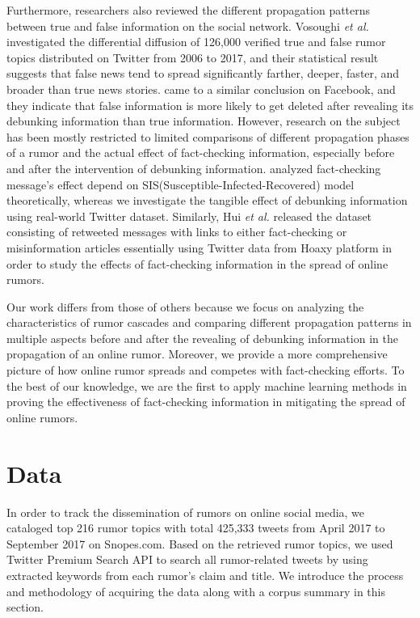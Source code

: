 \documentclass[conference]{IEEEtran}
\begin{document}
	Furthermore, researchers also reviewed the different propagation patterns between true and false information on the social network. Vosoughi \textit{et al.} \cite{vosoughi2018spread} investigated the differential diffusion of 126,000 verified true and false rumor topics distributed on Twitter from 2006 to 2017, and their statistical result suggests that false news tend to spread significantly farther, deeper, faster, and broader than true news stories. \cite{friggeri2014rumor} came to a similar conclusion on Facebook, and they indicate that false information is more likely to get deleted after revealing its debunking information than true information. However, research on the subject has been mostly restricted to limited comparisons of different propagation phases of a rumor and the actual effect of fact-checking information, especially before and after the intervention of debunking information. \cite{tambuscio2015fact} analyzed fact-checking message's effect depend on SIS(Susceptible-Infected-Recovered) model theoretically, whereas we investigate the tangible effect of debunking information using real-world Twitter dataset. Similarly, Hui \textit{et al.} \cite{hui2018hoaxy} released the dataset consisting of retweeted messages with links to either fact-checking or misinformation articles essentially using Twitter data from Hoaxy platform \cite{shao2016hoaxy} in order to study the effects of fact-checking information in the spread of online rumors.  
	
	Our work differs from those of others because we focus on analyzing the characteristics of rumor cascades and comparing different propagation patterns in multiple aspects before and after the revealing of debunking information in the propagation of an online rumor. Moreover, we provide a more comprehensive picture of how online rumor spreads and competes with fact-checking efforts. To the best of our knowledge, we are the first to apply machine learning methods in proving the effectiveness of fact-checking information in mitigating the spread of online rumors.
	
	
	\section{Data}
	In order to track the dissemination of rumors on online social media, we cataloged top 216 rumor topics with total 425,333 tweets from April 2017 to September 2017 on Snopes.com. Based on the retrieved rumor topics, we used Twitter Premium Search API to search all rumor-related tweets by using extracted keywords from each rumor's claim and title. We introduce the process and methodology of acquiring the data along with a corpus summary in this section. 
	
\end{document}
